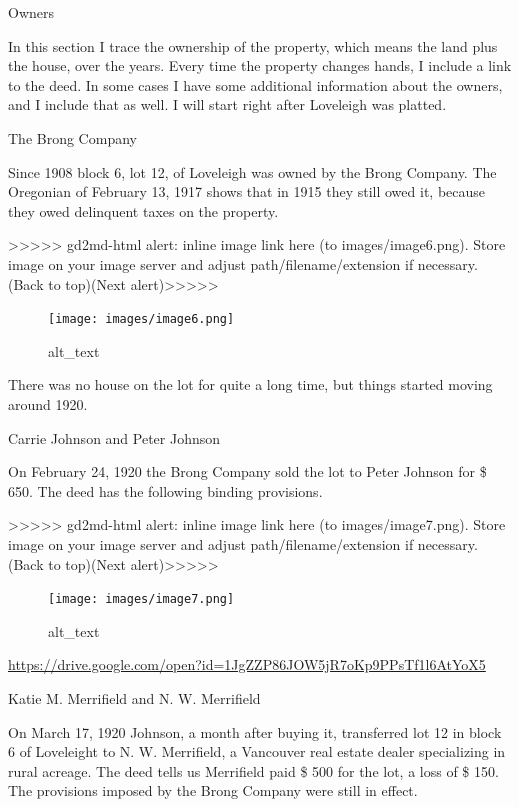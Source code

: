 \documentclass[
  12pt,
]{book}
\begin{document}
Owners

In this section I trace the ownership of the property, which means the land plus the house, over the years. Every time the property changes hands, I include a link to the deed. In some cases I have some additional information about the owners, and I include that as well. I will start right after Loveleigh was platted.

The Brong Company

Since 1908 block 6, lot 12, of Loveleigh was owned by the Brong Company. The Oregonian of February 13, 1917 shows that in 1915 they still owed it, because they owed delinquent taxes on the property.

{\textgreater\textgreater\textgreater\textgreater\textgreater{} gd2md-html alert: inline image link here (to images/image6.png). Store image on your image server and adjust path/filename/extension if necessary. }(Back to top)(Next alert){\textgreater\textgreater\textgreater\textgreater\textgreater{} }

\begin{figure}
\centering
\texttt{[image: images/image6.png]}
\caption{alt\_text}
\end{figure}

There was no house on the lot for quite a long time, but things started moving around 1920.

Carrie Johnson and Peter Johnson

On February 24, 1920 the Brong Company sold the lot to Peter Johnson for \$ 650. The deed has the following binding provisions.

{\textgreater\textgreater\textgreater\textgreater\textgreater{} gd2md-html alert: inline image link here (to images/image7.png). Store image on your image server and adjust path/filename/extension if necessary. }(Back to top)(Next alert){\textgreater\textgreater\textgreater\textgreater\textgreater{} }

\begin{figure}
\centering
\texttt{[image: images/image7.png]}
\caption{alt\_text}
\end{figure}

\url{https://drive.google.com/open?id=1JgZZP86JOW5jR7oKp9PPsTf1l6AtYoX5}

Katie M. Merrifield and N. W. Merrifield

On March 17, 1920 Johnson, a month after buying it, transferred lot 12 in block 6 of Loveleight to N. W. Merrifield, a Vancouver real estate dealer specializing in rural acreage. The deed tells us Merrifield paid \$ 500 for the lot, a loss of \$ 150. The provisions imposed by the Brong Company were still in effect.
\end{document}
